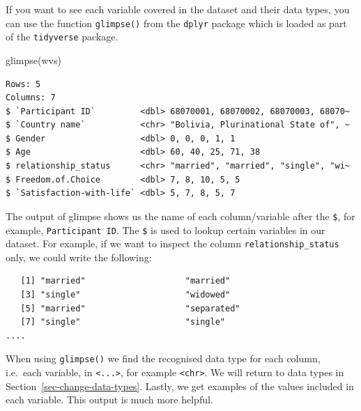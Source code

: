 \documentclass[
  letterpaper,
]{krantz}
\makeatletter
\newenvironment{Shaded}{\begin{snugshade}}{\end{snugshade}}
\newcommand{\FunctionTok}[1]{\textcolor[rgb]{0.28,0.35,0.67}{#1}}
\newcommand{\NormalTok}[1]{\textcolor[rgb]{0.00,0.23,0.31}{#1}}
\newcommand{\SpecialCharTok}[1]{\textcolor[rgb]{0.37,0.37,0.37}{#1}}
\newenvironment{kframe}{%
\medskip{}
\setlength{\fboxsep}{.8em}
 \def\at@end@of@kframe{}%
 \ifinner\ifhmode%
  \def\at@end@of@kframe{\end{minipage}}%
  \begin{minipage}{\columnwidth}%
 \fi\fi%
 \def\FrameCommand##1{\hskip\@totalleftmargin \hskip-\fboxsep
 \colorbox{shadecolor}{##1}\hskip-\fboxsep
     \hskip-\linewidth \hskip-\@totalleftmargin \hskip\columnwidth}%
 \MakeFramed {\advance\hsize-\width
   \@totalleftmargin\z@ \linewidth\hsize
   \@setminipage}}%
 {\par\unskip\endMakeFramed%
 \at@end@of@kframe}
\renewenvironment{Shaded}{\begin{kframe}}{\end{kframe}}
\makeatother
\begin{document}
If you want to see each variable covered in the dataset and their data
types, you can use the function \texttt{glimpse()} from the
\texttt{dplyr} package which is loaded as part of the \texttt{tidyverse}
package.

\begin{Shaded}
\begin{Highlighting}[]
\FunctionTok{glimpse}\NormalTok{(wvs)}
\end{Highlighting}
\end{Shaded}

\begin{verbatim}
Rows: 5
Columns: 7
$ `Participant ID`         <dbl> 68070001, 68070002, 68070003, 68070~
$ `Country name`           <chr> "Bolivia, Plurinational State of", ~
$ Gender                   <dbl> 0, 0, 0, 1, 1
$ Age                      <dbl> 60, 40, 25, 71, 38
$ relationship_status      <chr> "married", "married", "single", "wi~
$ Freedom.of.Choice        <dbl> 7, 8, 10, 5, 5
$ `Satisfaction-with-life` <dbl> 5, 7, 8, 5, 7
\end{verbatim}

The output of glimpse shows us the name of each column/variable after
the \texttt{\$}, for example,
\texttt{\textasciigrave{}Participant\ ID\textasciigrave{}}. The
\texttt{\$} is used to lookup certain variables in our dataset. For
example, if we want to inspect the column \texttt{relationship\_status}
only, we could write the following:

\begin{Shaded}
\end{Shaded}

\begin{verbatim}
   [1] "married"                    "married"                   
   [3] "single"                     "widowed"                   
   [5] "married"                    "separated"                 
   [7] "single"                     "single"                    
....
\end{verbatim}

When using \texttt{glimpse()} we find the recognised data type for each
column, i.e.~each variable, in \texttt{\textless{}...\textgreater{}},
for example \texttt{\textless{}chr\textgreater{}}. We will return to
data types in Section~\ref{sec-change-data-types}. Lastly, we get
examples of the values included in each variable. This output is much
more helpful.
\end{document}
